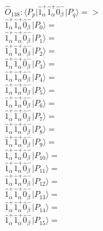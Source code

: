 \documentclass[14pt]{article}
\begin{document}
    $\hat{O}_{138}:  \langle{P_p}\vert \hat{1}_{\alpha}^{+}\hat{1}_{\alpha}^{+}\hat{0}_{\beta}^{-} \vert{P_q}\rangle => $ \\ 
    $ \hat{1}_{\alpha}^{+}\hat{1}_{\alpha}^{+}\hat{0}_{\beta}^{-} \vert{P_{0}}\rangle =  $ \\ 
    $ \hat{1}_{\alpha}^{+}\hat{1}_{\alpha}^{+}\hat{0}_{\beta}^{-} \vert{P_{1}}\rangle =  $ \\ 
    $ \hat{1}_{\alpha}^{+}\hat{1}_{\alpha}^{+}\hat{0}_{\beta}^{-} \vert{P_{2}}\rangle =  $ \\ 
    $ \hat{1}_{\alpha}^{+}\hat{1}_{\alpha}^{+}\hat{0}_{\beta}^{-} \vert{P_{3}}\rangle =  $ \\ 
    $ \hat{1}_{\alpha}^{+}\hat{1}_{\alpha}^{+}\hat{0}_{\beta}^{-} \vert{P_{4}}\rangle =  $ \\ 
    $ \hat{1}_{\alpha}^{+}\hat{1}_{\alpha}^{+}\hat{0}_{\beta}^{-} \vert{P_{5}}\rangle =  $ \\ 
    $ \hat{1}_{\alpha}^{+}\hat{1}_{\alpha}^{+}\hat{0}_{\beta}^{-} \vert{P_{6}}\rangle =  $ \\ 
    $ \hat{1}_{\alpha}^{+}\hat{1}_{\alpha}^{+}\hat{0}_{\beta}^{-} \vert{P_{7}}\rangle =  $ \\ 
    $ \hat{1}_{\alpha}^{+}\hat{1}_{\alpha}^{+}\hat{0}_{\beta}^{-} \vert{P_{8}}\rangle =  $ \\ 
    $ \hat{1}_{\alpha}^{+}\hat{1}_{\alpha}^{+}\hat{0}_{\beta}^{-} \vert{P_{9}}\rangle =  $ \\ 
    $ \hat{1}_{\alpha}^{+}\hat{1}_{\alpha}^{+}\hat{0}_{\beta}^{-} \vert{P_{10}}\rangle =  $ \\ 
    $ \hat{1}_{\alpha}^{+}\hat{1}_{\alpha}^{+}\hat{0}_{\beta}^{-} \vert{P_{11}}\rangle =  $ \\ 
    $ \hat{1}_{\alpha}^{+}\hat{1}_{\alpha}^{+}\hat{0}_{\beta}^{-} \vert{P_{12}}\rangle =  $ \\ 
    $ \hat{1}_{\alpha}^{+}\hat{1}_{\alpha}^{+}\hat{0}_{\beta}^{-} \vert{P_{13}}\rangle =  $ \\ 
    $ \hat{1}_{\alpha}^{+}\hat{1}_{\alpha}^{+}\hat{0}_{\beta}^{-} \vert{P_{14}}\rangle =  $ \\ 
    $ \hat{1}_{\alpha}^{+}\hat{1}_{\alpha}^{+}\hat{0}_{\beta}^{-} \vert{P_{15}}\rangle =  $ \\ 
    
\end{document}
